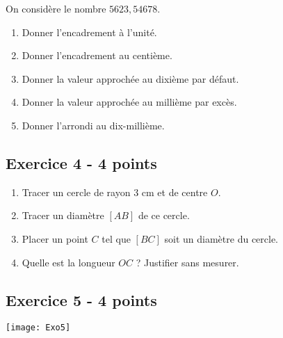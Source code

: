 \documentclass[12 pt]{extarticle}
\theoremstyle{plain}
\begin{document}
 On considère le nombre $5 623, 546 78$. \begin{enumerate}
 \item Donner l'encadrement à l'unité. 
 \item Donner l'encadrement au centième. 
 \item Donner la valeur approchée au dixième par défaut. 
 \item Donner la valeur approchée au millième par excès. 
 \item Donner l'arrondi au dix-millième. 
 \end{enumerate}
 
 \subsection*{Exercice 4 - 4 points}
 
\begin{enumerate}

\item  Tracer un cercle de rayon $3$ cm et de centre $O$.
 \item Tracer un diamètre $[AB]$ de ce cercle. 
 \item Placer un point $C$ tel que $[BC]$ soit un diamètre du cercle.
 \item Quelle est la longueur $OC$ ? Justifier sans mesurer. 
\end{enumerate}
 \subsection*{Exercice 5 - 4 points}
 \texttt{[image: Exo5]}
 	
\end{document}
